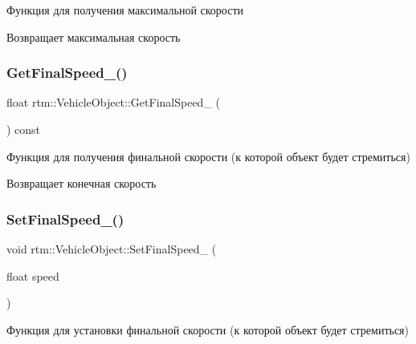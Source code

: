 Функция для получения максимальной скорости 

\begin{DoxyReturn}{Возвращает}
максимальная скорость 
\end{DoxyReturn}
\mbox{\label{classrtm_1_1_vehicle_object_a6cf4eb12c1eaf80b7f1e95ab206deae9}} 
\subsubsection{\texorpdfstring{Get\+Final\+Speed\+\_\+()}{GetFinalSpeed\_()}}
{\footnotesize\ttfamily float rtm\+::\+Vehicle\+Object\+::\+Get\+Final\+Speed\+\_\+ (\begin{DoxyParamCaption}{ }\end{DoxyParamCaption}) const\hspace{0.3cm}{\ttfamily [protected]}}



Функция для получения финальной скорости (к которой объект будет стремиться) 

\begin{DoxyReturn}{Возвращает}
конечная скорость 
\end{DoxyReturn}
\mbox{\label{classrtm_1_1_vehicle_object_a0339478b106ebe22b63a6d076204cc22}} 
\subsubsection{\texorpdfstring{Set\+Final\+Speed\+\_\+()}{SetFinalSpeed\_()}}
{\footnotesize\ttfamily void rtm\+::\+Vehicle\+Object\+::\+Set\+Final\+Speed\+\_\+ (\begin{DoxyParamCaption}\item[{float}]{speed }\end{DoxyParamCaption})\hspace{0.3cm}{\ttfamily [protected]}}



Функция для установки финальной скорости (к которой объект будет стремиться) 


